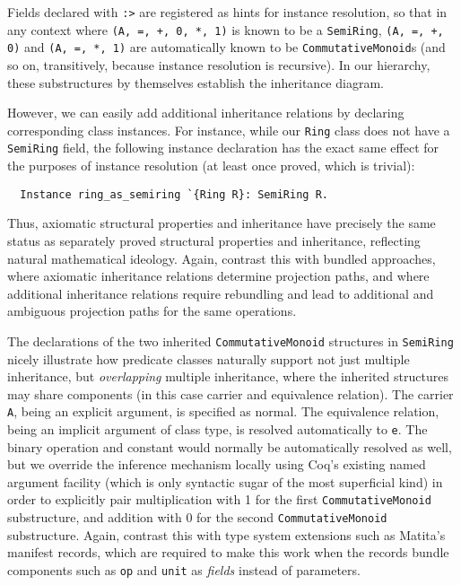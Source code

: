 \documentclass[a4paper,10pt,runningheads]{llncs}
\begin{document}
Fields declared with \lstinline|:>| are registered as hints for instance resolution, so that in any context where \lstinline|(A, =, +, 0, *, 1)| is known to be a \lstinline|SemiRing|, \lstinline|(A, =, +, 0)| and \lstinline|(A, =, *, 1)| are automatically known to be \lstinline|CommutativeMonoid|s (and so on, transitively, because instance resolution is recursive). In our hierarchy, these substructures by themselves establish the inheritance diagram.

However, we can easily add additional inheritance relations by declaring corresponding class instances. For instance, while our \lstinline|Ring| class does not have a \lstinline|SemiRing| field, the following instance declaration has the exact same effect for the purposes of instance resolution (at least once proved, which is trivial):
\begin{lstlisting}
  Instance ring_as_semiring `{Ring R}: SemiRing R.
\end{lstlisting}

Thus, axiomatic structural properties and inheritance have precisely the same status as separately proved structural properties and inheritance, reflecting natural mathematical ideology. Again, contrast this with bundled approaches, where axiomatic inheritance relations determine projection paths, and where additional inheritance relations require rebundling and lead to additional and ambiguous projection paths for the same operations.

The declarations of the two inherited \lstinline|CommutativeMonoid| structures in \lstinline|SemiRing| nicely illustrate how predicate classes naturally support not just multiple inheritance, but \emph{overlapping} multiple inheritance, where the inherited structures may share components (in this case carrier and equivalence relation). The carrier \lstinline|A|, being an explicit argument, is specified as normal. The equivalence relation, being an implicit argument of class type, is resolved automatically to \lstinline|e|. The binary operation and constant would normally be automatically resolved as well, but we override the inference mechanism locally using Coq's existing named argument facility (which is only syntactic sugar of the most superficial kind) in order to explicitly pair multiplication with 1 for the first \lstinline|CommutativeMonoid| substructure, and addition with 0 for the second \lstinline|CommutativeMonoid| substructure. Again, contrast this with type system extensions such as Matita's manifest records, which are required to make this work when the records bundle components such as \lstinline|op| and \lstinline{unit} as \emph{fields} instead of parameters.
\end{document}
